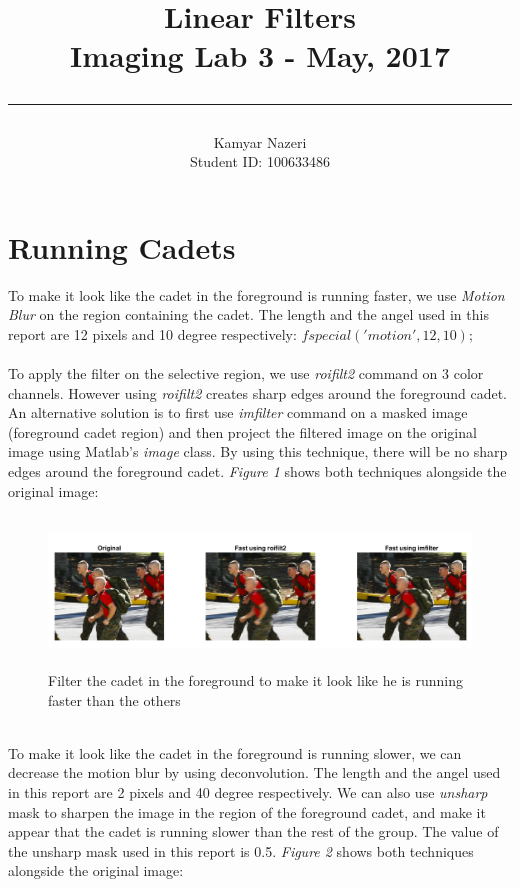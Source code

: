 \documentclass[a4paper,11pt]{article}
\begin{document}
\title{
	\Huge \textbf {Linear Filters}
    \\ [0.2cm]
	\LARGE Imaging Lab 3 - May, 2017
    \\ [0.5cm]
    \hrule
}

\date{}

\author{
		\Large Kamyar Nazeri \\
		\large Student ID: 100633486 }

\maketitle
\newpage

\section*{Running Cadets}
To make it look like the cadet in the foreground is running faster, we use \emph{Motion Blur} on the region containing the cadet. The length and the angel used in this report are 12 pixels and 10 degree respectively: $fspecial('motion', 12, 10);$
\\\\
To apply the filter on the selective region, we use \emph{roifilt2} command on 3 color channels. However using \emph{roifilt2} creates sharp edges around the foreground cadet. An alternative solution is to first use \emph{imfilter} command on a masked image (foreground cadet region) and then project the filtered image on the original image using Matlab's \emph{image} class. By using this technique, there will be no sharp edges around the foreground cadet. \emph{Figure 1} shows both techniques alongside the original image:

\begin{figure}[!htb]
  \centering
  \includegraphics[width=16cm, height=4cm]{1.png}
  \caption{\small Filter the cadet in the foreground to make it look like he is running faster than the others}
\end{figure}

 \\To make it look like the cadet in the foreground is running slower, we can decrease the motion blur by using deconvolution. The length and the angel used in this report are 2 pixels and 40 degree respectively. We can also use \emph{unsharp} mask to sharpen the image in the region of the foreground cadet, and make it appear that the cadet is running slower than the rest of the group. The value of the unsharp mask used in this report is 0.5. \emph{Figure 2} shows both techniques alongside the original image:
\end{document}
